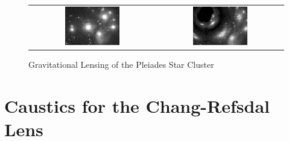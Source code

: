 \documentclass[aspectratio=1610,xcolor=dvipsnames,t]{beamer}
\begin{document}
\begin{figure}
    \caption{Gravitational Lensing of the Pleiades Star Cluster} 
    \label{fig:pleiades} 
    \begin{center}
        \begin{tabular}{cc}
            \includegraphics[width=0.45\textwidth]{Pics/pl.eps} &
            \includegraphics[width=0.45\textwidth]{Pics/pl2e30.eps} 
        \end{tabular}
    \end{center}
\end{figure}

\section{Caustics for the Chang-Refsdal Lens}
\end{document}
